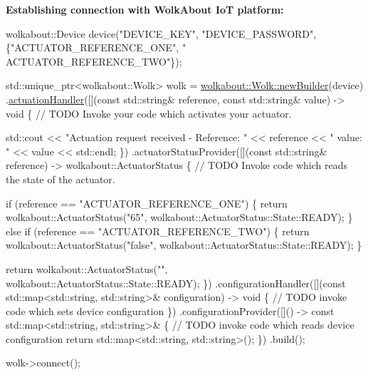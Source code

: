{\bfseries Establishing connection with Wolk\+About IoT platform\+:} 
\begin{DoxyCode}
wolkabout::Device device(\textcolor{stringliteral}{"DEVICE\_KEY"}, \textcolor{stringliteral}{"DEVICE\_PASSWORD"}, \{\textcolor{stringliteral}{"ACTUATOR\_REFERENCE\_ONE"}, \textcolor{stringliteral}{"
      ACTUATOR\_REFERENCE\_TWO"}\});

std::unique\_ptr<wolkabout::Wolk> wolk =
  \hyperlink{classwolkabout_1_1_wolk_a91270bb8552c2dee634e552111db4bb0}{wolkabout::Wolk::newBuilder}(device)
    .\hyperlink{classwolkabout_1_1_wolk_builder_a5c8799ad21b6bb0f0c866af3295a69b7}{actuationHandler}([](\textcolor{keyword}{const} std::string& reference, \textcolor{keyword}{const} std::string& value) -> \textcolor{keywordtype}{void} \{
        \textcolor{comment}{// TODO Invoke your code which activates your actuator.}

        std::cout << \textcolor{stringliteral}{"Actuation request received - Reference: "} << reference << \textcolor{stringliteral}{" value: "} << value << 
      std::endl;
    \})
    .actuatorStatusProvider([](\textcolor{keyword}{const} std::string& reference) -> wolkabout::ActuatorStatus \{
        \textcolor{comment}{// TODO Invoke code which reads the state of the actuator.}

        \textcolor{keywordflow}{if} (reference == \textcolor{stringliteral}{"ACTUATOR\_REFERENCE\_ONE"}) \{
            \textcolor{keywordflow}{return} wolkabout::ActuatorStatus(\textcolor{stringliteral}{"65"}, wolkabout::ActuatorStatus::State::READY);
        \} \textcolor{keywordflow}{else} \textcolor{keywordflow}{if} (reference == \textcolor{stringliteral}{"ACTUATOR\_REFERENCE\_TWO"}) \{
            \textcolor{keywordflow}{return} wolkabout::ActuatorStatus(\textcolor{stringliteral}{"false"}, wolkabout::ActuatorStatus::State::READY);
        \}

        \textcolor{keywordflow}{return} wolkabout::ActuatorStatus(\textcolor{stringliteral}{""}, wolkabout::ActuatorStatus::State::READY);
    \})
    .configurationHandler([](\textcolor{keyword}{const} std::map<std::string, std::string>& configuration) -> \textcolor{keywordtype}{void} \{
        \textcolor{comment}{// TODO invoke code which sets device configuration}
    \})
    .configurationProvider([]() -> \textcolor{keyword}{const} std::map<std::string, std::string>& \{
        \textcolor{comment}{// TODO invoke code which reads device configuration}
        \textcolor{keywordflow}{return} std::map<std::string, std::string>();
    \})
    .build();

    wolk->connect();
\end{DoxyCode}


